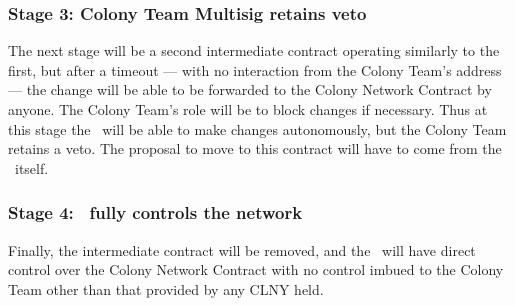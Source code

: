 \subsubsection*{Stage 3: Colony Team Multisig retains veto}
The next stage will be a second intermediate contract operating similarly to the first, but after a timeout --- with no interaction from the Colony Team's address --- the change will be able to be forwarded to the Colony Network Contract by anyone. The Colony Team's role will be to block changes if necessary. Thus at this stage the \rc\ will be able to make changes autonomously, but the Colony Team retains a veto.  The proposal to move to this contract will have to come from the \rc\ itself.

\subsubsection*{Stage 4: \rc\ fully controls the network}
Finally, the intermediate contract will be removed, and the \rc\ will have direct control over the Colony Network Contract with no control imbued to the Colony Team other than that provided by any CLNY held.

